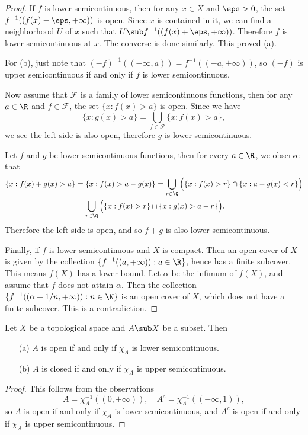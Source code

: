 \begin{proof}
If $f$ is lower semicontinuous, then for any $x\in X$ and $\eps>0$, the set $f^{-1}((f(x)-\eps,+\infty))$ is open. Since $x$ is contained in it, we can find a neighborhood $U$ of $x$ such that $U\sub f^{-1}((f(x)+\eps,+\infty))$. Therefore $f$ is lower semicontinuous at $x$. The converse is done similarly. This proved (a).\par
For (b), just note that $(-f)^{-1}((-\infty,a))=f^{-1}((-a,+\infty))$, so $(-f)$ is upper semicontinuous if and only if $f$ is lower semicontinuous.\par
Now assume that $\mathscr{F}$ is a family of lower semicontinuous functions, then for any $a\in\R$ and $f\in\mathscr{F}$, the set $\{x:f(x)>a\}$ is open. Since we have
\[\{x:g(x)>a\}=\bigcup_{f\in\mathscr{F}}\{x:f(x)>a\},\]
we see the left side is also open, therefore $g$ is lower semicontinuous.\par
Let $f$ and $g$ be lower semicontinuous functions, then for every $a\in\R$, we observe that
\begin{align*}
\{x:f(x)+g(x)>a\}&=\{x:f(x)>a-g(x)\}=\bigcup_{r\in\Q}\Big(\{x:f(x)>r\}\cap\{x:a-g(x)<r\}\Big)\\
&=\bigcup_{r\in\Q}\Big(\{x:f(x)>r\}\cap\{x:g(x)>a-r\}\Big).
\end{align*}
Therefore the left side is open, and so $f+g$ is also lower semicontinuous.\par
Finally, if $f$ is lower semicontinuous and $X$ is compact. Then an open cover of $X$ is given by the collection $\{f^{-1}((a,+\infty)):a\in\R\}$, hence has a finite subcover. This means $f(X)$ has a lower bound. Let $\alpha$ be the infimum of $f(X)$, and assume that $f$ does not attain $\alpha$. Then the collection $\{f^{-1}((\alpha+1/n,+\infty)):n\in\N\}$ is an open cover of $X$, which does not have a finite subcover. This is a contradiction.  
\end{proof}
\begin{proposition}\label{lower semicontinuous open closed}
Let $X$ be a topological space and $A\sub X$ be a subset. Then
\begin{itemize}
\item[(a)] $A$ is open if and only if $\chi_A$ is lower semicontinuous.
\item[(b)] $A$ is closed if and only if $\chi_A$ is upper semicontinuous. 
\end{itemize}
\end{proposition}
\begin{proof}
This follows from the observations
\[A=\chi_A^{-1}((0,+\infty)),\quad A^c=\chi_A^{-1}((-\infty,1)),\]
so $A$ is open if and only if $\chi_A$ is lower semicontinuous, and $A^c$ is open if and only if $\chi_A$ is upper semicontinuous.
\end{proof}
